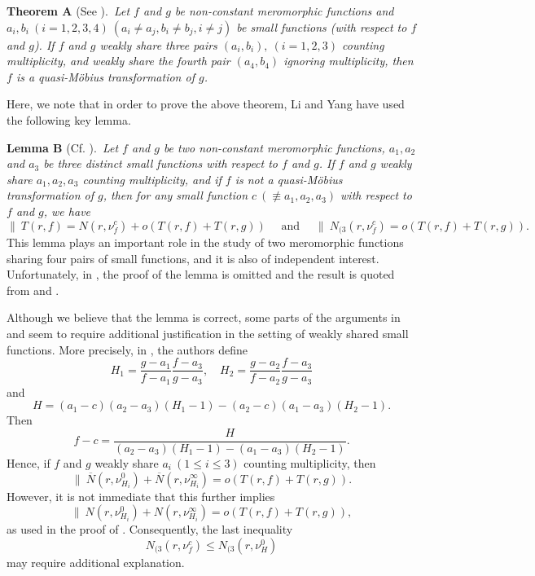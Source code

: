 \documentclass[12pt,leqno]{amsart}
\numberwithin{equation}{section}
\begin{document}
\vskip0.2cm
\noindent
\textbf{Theorem A} (See \cite[Theorem 1]{LY2}).\ {\it Let $f$ and $g$ be non-constant meromorphic functions and $a_i,b_i\ (i=1,2,3,4)\ (a_i\ne a_j, b_i\ne b_j, i\ne j)$ be small functions (with respect to $f$ and $g$). If $f$ and $g$ weakly share three pairs $(a_i, b_i),\ (i=1,2,3)$ counting multiplicity, and weakly share the fourth pair $(a_4, b_4)$ ignoring multiplicity, then $f$ is a quasi-M\"{o}bius transformation of $g$.}

Here, we note that in order to prove the above theorem, Li and Yang have used the following key lemma.

\vskip0.2cm
\noindent
\textbf{Lemma B} (Cf. \cite[Lemma 1]{LY2}).\ {\it Let $f$ and $g$ be two non-constant meromorphic functions, $a_1, a_2$ and $a_3$ be three distinct small functions with respect to $f$ and $g$. If $f$ and $g$ weakly share $a_1, a_2, a_3$ counting multiplicity, and if $f$ is not a quasi-M\"{o}bius transformation of $g$, then for any small function $c\ (\not\equiv a_1,a_2,a_3)$ with respect to $f$ and $g$, we have
$$\|\ T(r, f)=N(r, \nu^c_f)+o(T(r,f)+T(r,g)) \quad \text { and } \quad \|\ N_{(3}(r,\nu^c_f)=o(T(r,f)+T(r,g)).$$}
\indent
This lemma plays an important role in the study of two meromorphic functions sharing four pairs of small functions, and it is also of independent interest. Unfortunately, in \cite{LY2}, the proof of the lemma is omitted and the result is quoted from \cite[Lemma 5]{LY1} and \cite[Lemma 8]{LZ}.  

Although we believe that the lemma is correct, some parts of the arguments in \cite[Lemma 5]{LY1} and \cite[Lemma 8]{LZ} seem to require additional justification in the setting of weakly shared small functions. More precisely, in \cite{LZ}, the authors define
$$H_1=\frac{g-a_1}{f-a_1} \frac{f-a_3}{g-a_3}, \quad 
H_2=\frac{g-a_2}{f-a_2} \frac{f-a_3}{g-a_3}$$
and
$$H=\left(a_1-c\right)\left(a_2-a_3\right)\left(H_1-1\right)-\left(a_2-c\right)\left(a_1-a_3\right)\left(H_2-1\right).$$
Then
$$f-c=\frac{H}{\left(a_2-a_3\right)\left(H_1-1\right)-\left(a_1-a_3\right)\left(H_2-1\right)}.$$
Hence, if $f$ and $g$ weakly share $a_i\ (1\le i\le 3)$ counting multiplicity, then
$$\|\ \overline N(r,\nu^0_{H_i})+\overline N(r,\nu^\infty_{H_i})
=o(T(r,f)+T(r,g)).$$
However, it is not immediate that this further implies
$$\|\ N(r,\nu^0_{H_i})+N(r,\nu^\infty_{H_i})
=o(T(r,f)+T(r,g)),$$
as used in the proof of \cite[Lemma 8]{LZ}. Consequently, the last inequality
$$N_{(3}(r,\nu^c_f)\le N_{(3}(r,\nu^0_H)$$
may require additional explanation.  
\end{document}
